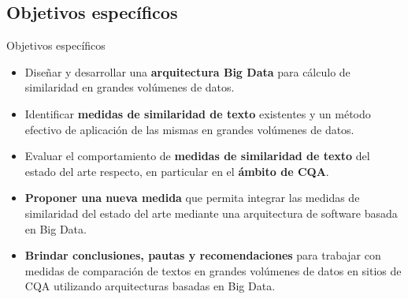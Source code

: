 \subsection{Objetivos específicos}
\begin{frame}{Objetivos específicos}
	\begin{tcolorbox}[colback=blue!5,colframe=blue!40!black,title=Objetivos específicos]
		\begin{footnotesize}
			\begin{itemize} [<+>]
				\item Diseñar y desarrollar una \textbf{arquitectura Big Data} para cálculo de similaridad en grandes volúmenes de datos.
				\item Identificar \textbf{medidas de similaridad de texto} existentes y un método efectivo de aplicación de las mismas en grandes volúmenes de datos.
				\item Evaluar el comportamiento de \textbf{medidas de similaridad de texto} del estado del arte respecto, en particular en el \textbf{ámbito de CQA}.
				\item \textbf{Proponer una nueva medida} que permita integrar las medidas de similaridad del estado del arte mediante una arquitectura de software basada en Big Data.
				\item \textbf{Brindar conclusiones, pautas y recomendaciones} para trabajar con medidas de comparación de textos en grandes volúmenes de datos en sitios de CQA utilizando arquitecturas basadas en Big Data.
			\end{itemize}
		\end{footnotesize}
	\end{tcolorbox}
\end{frame}